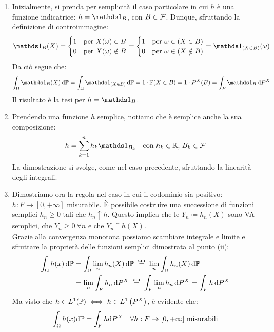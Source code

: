 \begin{dimo}
  \Fixvmode
  \begin{enumerate}[label=(\roman*)]
    \item Inizialmente, si prenda per semplicità il caso particolare in cui $h$ è una funzione indicatrice: $h = \Ind_B$, con $B \in \mathcal F$. Dunque, sfruttando la definizione di controimmagine:
    $$
      \Ind_{B}(X)=\begin{cases}
      1 &\text{per } X(\omega)\in B\\
      0 &\text{per } X(\omega)\notin B
      \end{cases}
      =\begin{cases}
      1 &\text{per } \omega\in(X\in B)\\
      0 &\text{per } \omega\in(X\notin B)
      \end{cases}
      =\Ind_{(X\in B)}(\omega)
    $$
    Da ciò segue che:
    $$
      \int_{\Omega}\Ind_{B}(X)\,\dPP=\int_{\Omega}\Ind_{(X\in B)} \,\dPP =1\cdot\PP(X\in B)=1\cdot P^{X}(B)=\int_{F}\Ind_{B} \,\de P^X
    $$
    Il risultato è la tesi per $h = \Ind_B$.

    \medskip

    \item Prendendo una funzione $h$ semplice, notiamo che è semplice anche la sua composizione:
    $$
      h=\sum_{k=1}^{n}h_{k}\Ind_{B_{k}} \quad \text{con } h_{k}\in\RR, \, B_{k}\in\Fc
    $$
    La dimostrazione si svolge, come nel caso precedente, sfruttando la linearità degli integrali.

    \medskip

    \item Dimostriamo ora la regola nel caso in cui il codominio sia positivo: $h: F \to [0, +\infty]$ misurabile.
    È possibile costruire una successione di funzioni semplici $h_n \geq 0$ tali che $h_n \uparrow h$.
    Questo implica che le $Y_n \coloneqq h_n(X)$ sono VA semplici, che $Y_n \geq 0 \ \forall n$ e che $Y_n \uparrow h(X)$.\\
    Grazie alla convergenza monotona possiamo scambiare integrale e limite e sfruttare la proprietà delle funzioni semplici dimostrata al punto (ii):
    \begin{align*}
      \int_{\Omega}h(x) \, \mathrm d \mathbb P
      &= \int_{\Omega}\lim\limits_n h_n(X) \, \mathrm d \mathbb P \;
      \stackrel{\text{cm}}{=} \; \lim\limits_{n}\int_{\Omega}h_{n}(X) \, \mathrm d \mathbb P \\
      &= \lim\limits_n \int_F h_n \, \mathrm d P^X \;
      \stackrel{\text{cm}}{=} \; \int_F \lim\limits_n h_n \, \mathrm d P^X
      = \int_F h \, \mathrm d P^X
    \end{align*}
    Ma visto che $h \in L^1 (\mathbb P) \iff h\in L^1 \left(P^X\right)$, è evidente che:
    $$\int_\Omega h(x) \mathrm d \mathbb P = \int_F h \mathrm d P^X \quad \forall h:F\to[0, +\infty] \text{ misurabili}$$
    \medskip


\end{enumerate}
\end{dimo}
